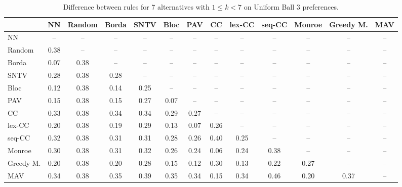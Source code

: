 
\begin{table*}[h!]
\centering
\begin{tabular}{lcccccccccccc}
\toprule
 & NN & Random & Borda & SNTV & Bloc & PAV & CC & lex-CC & seq-CC & Monroe & Greedy M. & MAV \\
\midrule
NN & -- & -- & -- & -- & -- & -- & -- & -- & -- & -- & -- & -- \\
Random & 0.38 & -- & -- & -- & -- & -- & -- & -- & -- & -- & -- & -- \\
Borda & 0.07 & 0.38 & -- & -- & -- & -- & -- & -- & -- & -- & -- & -- \\
SNTV & 0.28 & 0.38 & 0.28 & -- & -- & -- & -- & -- & -- & -- & -- & -- \\
Bloc & 0.12 & 0.38 & 0.14 & 0.25 & -- & -- & -- & -- & -- & -- & -- & -- \\
PAV & 0.15 & 0.38 & 0.15 & 0.27 & 0.07 & -- & -- & -- & -- & -- & -- & -- \\
CC & 0.33 & 0.38 & 0.34 & 0.34 & 0.29 & 0.27 & -- & -- & -- & -- & -- & -- \\
lex-CC & 0.20 & 0.38 & 0.19 & 0.29 & 0.13 & 0.07 & 0.26 & -- & -- & -- & -- & -- \\
seq-CC & 0.32 & 0.38 & 0.31 & 0.31 & 0.28 & 0.26 & 0.40 & 0.25 & -- & -- & -- & -- \\
Monroe & 0.30 & 0.38 & 0.31 & 0.32 & 0.26 & 0.24 & 0.06 & 0.24 & 0.38 & -- & -- & -- \\
Greedy M. & 0.20 & 0.38 & 0.20 & 0.28 & 0.15 & 0.12 & 0.30 & 0.13 & 0.22 & 0.27 & -- & -- \\
MAV & 0.34 & 0.38 & 0.35 & 0.39 & 0.35 & 0.34 & 0.15 & 0.34 & 0.46 & 0.20 & 0.37 & -- \\
\bottomrule
\end{tabular}

\caption{Difference between rules for 7 alternatives with $1 \leq k < 7$ on Uniform Ball 3 preferences.}
\end{table*}

